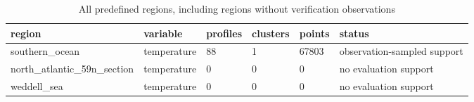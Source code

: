 \begin{table}[htbp]
\centering
\caption{All predefined regions, including regions without verification observations}
\begin{tabular}{llllll}
\toprule
region & variable & profiles & clusters & points & status \\
\midrule
southern\_ocean & temperature & 88 & 1 & 67803 & observation-sampled support \\
north\_atlantic\_59n\_section & temperature & 0 & 0 & 0 & no evaluation support \\
weddell\_sea & temperature & 0 & 0 & 0 & no evaluation support \\
\bottomrule
\end{tabular}
\end{table}
